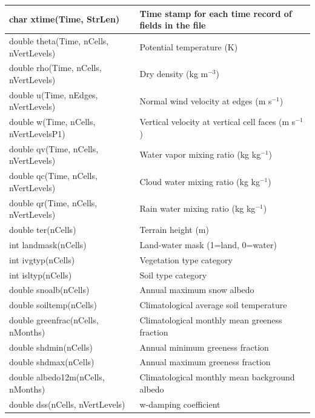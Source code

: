 \documentclass[11pt]{report}
\begin{document}
{\small     
\begin{longtable}{|p{2.5in} |p{3.75in}|}
 \hline
        char xtime(Time, StrLen)     & Time stamp for each time record of fields in the file \\ \hline
        double \hfil\break theta(Time, nCells, nVertLevels)      &        Potential temperature (K) \\ \hline
        double rho(Time, nCells, nVertLevels)        &        Dry density (kg m$^{-3}$) \\ \hline
        double u(Time, nEdges, nVertLevels)         & Normal wind velocity at edges (m s$^{-1}$) \\ \hline
        double \hfil\break w(Time, nCells, nVertLevelsP1)       & Vertical velocity at vertical cell faces (m s$^{-1}$) \\ \hline
        double qv(Time, nCells, nVertLevels)   &              Water vapor mixing ratio (kg kg$^{-1}$) \\ \hline
        double qc(Time, nCells, nVertLevels)   &              Cloud water mixing ratio (kg kg$^{-1}$) \\ \hline
        double qr(Time, nCells, nVertLevels)   &              Rain water mixing ratio (kg kg$^{-1}$) \\ \hline
        double ter(nCells)           &  Terrain height (m) \\ \hline
        int landmask(nCells)         &  Land-water mask (1=land, 0=water) \\ \hline
        int ivgtyp(nCells)           &  Vegetation type category \\ \hline
        int isltyp(nCells)           &  Soil type category \\ \hline
        double snoalb(nCells)        &  Annual maximum snow albedo \\ \hline
        double soiltemp(nCells)      &  Climatological average soil temperature \\ \hline
        double greenfrac(nCells, nMonths)    & Climatological monthly mean greeness fraction \\ \hline
        double shdmin(nCells)                & Annual minimum greeness fraction \\ \hline
        double shdmax(nCells)                & Annual maximum greeness fraction \\ \hline
        double albedo12m(nCells, nMonths)    & Climatological monthly mean background albedo \\ \hline
        double dss(nCells, nVertLevels)         & w-damping coefficient \\ \hline

\end{longtable}}
\end{document}
